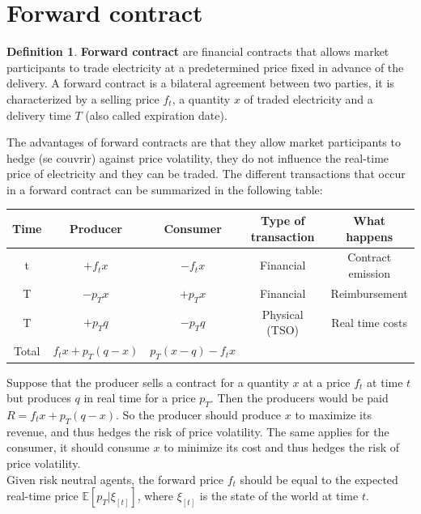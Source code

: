 \documentclass[12pt, openany]{report}
\theoremstyle{definition}
\newtheorem{definition}[thm]{Definition}
\begin{document}
\section{Forward contract}
\begin{definition}
    \textbf{Forward contract} are financial contracts that allows market participants to trade electricity at a predetermined price fixed in advance of the delivery. A forward contract is a bilateral agreement between two parties, it is characterized by a selling price $f_t$, a quantity $x$ of traded electricity and a delivery time $T$ (also called expiration date).
\end{definition}
The advantages of forward contracts are that they allow market participants to hedge (se couvrir) against price volatility, they do not influence the real-time price of electricity and they can be traded. The different transactions that occur in a forward contract can be summarized in the following table:
\begin{center}
    \begin{tabular}{|c|c|c|c|c|}
        \hline
        Time & Producer & Consumer & Type of transaction & What happens\\
        \hline
        t &  $+f_t x$ & $-f_t x$ & Financial & Contract emission\\
        \hline
        T & $-p_T x$ & $+p_T x$ & Financial & Reimbursement\\
        \hline
        T & $+p_T q$ & $-p_T q$ & Physical (TSO) & Real time costs\\
        \hline
        \hline
        Total & $f_t x + p_T (q - x)$ & $p_T (x - q) - f_t x$ & & \\
        \hline
    \end{tabular}
\end{center}
Suppose that the producer sells a contract for a quantity $x$ at a price $f_t$ at time $t$ but produces $q$ in real time for a price $p_T$. Then the producers would be paid $R = f_t x + p_T (q - x)$. So the producer should produce $x$ to maximize its revenue, and thus hedges the risk of price volatility. The same applies for the consumer, it should consume $x$ to minimize its cost and thus hedges the risk of price volatility.\\
Given risk neutral agents, the forward price $f_t$ should be equal to the expected real-time price $\mathbb{E}[p_T|\xi_{[t]}]$, where $\xi_{[t]}$ is the state of the world at time $t$. 
\end{document}

